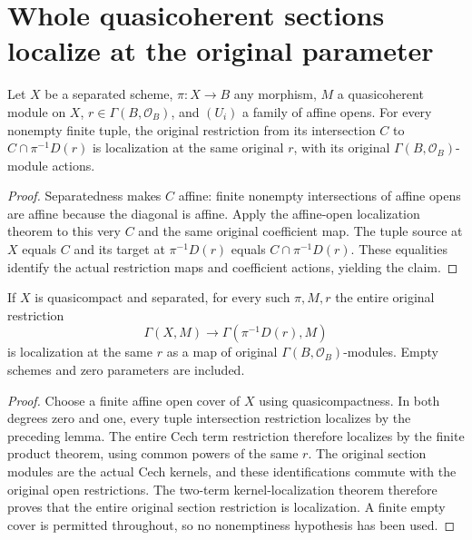 \section{Whole quasicoherent sections localize at the original parameter}

\begin{lemma}
\label{lem:scheme-module-affine-tuple-localization}
\leanok
{}
Let $X$ be a separated scheme, $\pi:X\to B$ any morphism,
$M$ a quasicoherent module on $X$, $r\in\Gamma(B,\mathcal O_B)$,
and $(U_i)$ a family of affine opens. For every nonempty finite tuple,
the original restriction from its intersection $C$ to
$C\cap\pi^{-1}D(r)$ is localization at the same original $r$,
with its original $\Gamma(B,\mathcal O_B)$-module actions.
\end{lemma}
\begin{proof}
Separatedness makes $C$ affine: finite nonempty intersections
of affine opens are affine because the diagonal is affine.
Apply the affine-open localization theorem to this very $C$
and the same original coefficient map. The tuple source at
$X$ equals $C$ and its target at $\pi^{-1}D(r)$ equals
$C\cap\pi^{-1}D(r)$. These equalities identify the actual
restriction maps and coefficient actions, yielding the claim.
\end{proof}

\begin{theorem}
\label{thm:scheme-module-whole-principal-localization}
\leanok
{}
If $X$ is quasicompact and separated, for every such $\pi,M,r$
the entire original restriction
\[
 \Gamma(X,M)\longrightarrow\Gamma(\pi^{-1}D(r),M)
\]
is localization at the same $r$ as a map of original
$\Gamma(B,\mathcal O_B)$-modules. Empty schemes and zero
parameters are included.
\end{theorem}
\begin{proof}
Choose a finite affine open cover of $X$ using quasicompactness.
In both degrees zero and one, every tuple intersection
restriction localizes by the preceding lemma. The entire
Cech term restriction therefore localizes by the finite
product theorem, using common powers of the same $r$.
The original section modules are the actual Cech kernels,
and these identifications commute with the original open
restrictions. The two-term kernel-localization theorem
therefore proves that the entire original section restriction
is localization. A finite empty cover is permitted throughout,
so no nonemptiness hypothesis has been used.
\end{proof}
